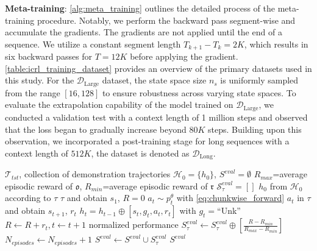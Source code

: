 \documentclass{article}
\begin{document}
\textbf{Meta-training}: \cref{alg:meta_training} outlines the detailed process of the meta-training procedure. Notably, we perform the backward pass segment-wise and accumulate the gradients. The gradients are not applied until the end of a sequence. We utilize a constant segment length $ T_{k+1} - T_k = 2K $, which results in six backward passes for $ T = 12K $ before applying the gradient.
\cref{table:icrl_training_dataset} provides an overview of the primary datasets used in this study. For the $\mathcal{D}_{\text{Large}}$ dataset, the state space size $ n_s $ is uniformly sampled from the range $[16, 128]$ to ensure robustness across varying state spaces. To evaluate the extrapolation capability of the model trained on $\mathcal{D}_{\text{Large}}$, we conducted a validation test with a context length of 1 million steps and observed that the loss began to gradually increase beyond $80K$ steps. Building upon this observation, we incorporated a post-training stage for long sequences with a context length of $512K$, the dataset is denoted as $\mathcal{D}_{\text{Long}}$.
\begin{algorithm}[htbp]
   \caption{Evaluation Process}
   \label{alg:evaluation_process}
    \begin{algorithmic}
        $\mathcal{T}_{tst}$, collection of demonstration trajectories $\mathcal{H}_0=\{h_0\}$,
        $S^{eval}=\emptyset$
             $R_{max}$=average episodic reward of $\mathfrak{o}$, $R_{min}$=average episodic reward of $\mathfrak{r}$
              $\mathcal{S}^{eval}_{\tau}=[]$
            \REPEAT
                 $h_0$ from $\mathcal{H}_0$ according to $\tau$
                 $\tau$ and obtain $s_1$, $R=0$
                \REPEAT
                     $a_t \sim p^{\theta}_t$ with \cref{eq:chunkwise_forward}
                     $a_t$ in $\tau$ and obtain $s_{t+1}$, $r_t$
                     $h_{t}=h_{t-1} \oplus [s_t, g_t,a_t,r_t] $ with $g_t=$``Unk''
                     $R \leftarrow R+r_t, t \leftarrow t+1$
                 normalized performance $S^{eval}_{\tau} \leftarrow S^{eval}_{\tau} \oplus [\frac{R - R_{min}}{R_{max} - R_{min}}]$
                 $N_{episodes} \leftarrow N_{episodes} + 1$
             $S^{eval} \leftarrow S^{eval} \cup S^{eval}_{\tau}$
       \ENDFOR
         $S^{eval}$
    \end{algorithmic}
\end{algorithm}
\end{document}
